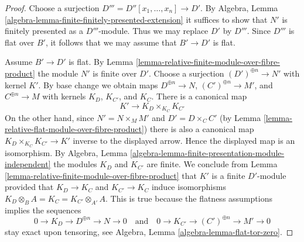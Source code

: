 \begin{proof}
Choose a surjection $D''' = D''[x_1, \ldots, x_n] \to D'$.
By Algebra, Lemma \ref{algebra-lemma-finite-finitely-presented-extension}
it suffices to show that $N'$ is finitely presented as a
$D'''$-module. Thus we may replace $D'$ by $D'''$. Since $D'''$ is
flat over $B'$, it follows that we may assume that $B' \to D'$ is flat.

\medskip\noindent
Assume $B' \to D'$ is flat.
By Lemma \ref{lemma-relative-finite-module-over-fibre-product}
the module $N'$ is finite over $D'$. Choose a surjection
$(D')^{\oplus n} \to N'$ with kernel $K'$. By base change we obtain maps
$D^{\oplus n} \to N$, $(C')^{\oplus n} \to M'$, and $C^{\oplus n} \to M$
with kernels $K_D$, $K_{C'}$, and $K_C$. There is a canonical map
$$
K' \longrightarrow K_D \times_{K_C} K_{C'}
$$
On the other hand, since $N' = N \times_M M'$ and
$D' = D \times_C C'$ (by
Lemma \ref{lemma-relative-flat-module-over-fibre-product})
there is also a
canonical map $K_D \times_{K_C} K_{C'} \to K'$ inverse to the displayed
arrow. Hence the displayed map is an isomorphism. By
Algebra, Lemma \ref{algebra-lemma-finite-presentation-module-independent}
the modules $K_D$ and $K_{C'}$ are finite. We conclude from
Lemma \ref{lemma-relative-finite-module-over-fibre-product}
that $K'$ is a finite $D'$-module provided that $K_D \to K_C$ and
$K_{C'} \to K_C$ induce isomorphisms
$K_D \otimes_B A = K_C = K_{C'} \otimes_{A'} A$.
This is true because the flatness assumptions implies the sequences
$$
0 \to K_D \to D^{\oplus n} \to N \to 0
\quad\text{and}\quad
0 \to K_{C'} \to (C')^{\oplus n} \to M' \to 0
$$
stay exact upon tensoring, see
Algebra, Lemma \ref{algebra-lemma-flat-tor-zero}.
\end{proof}

